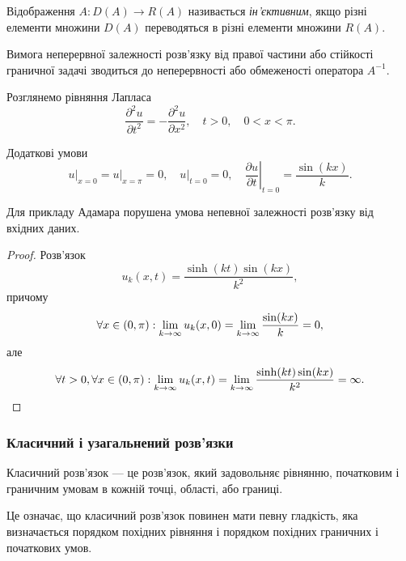 \begin{definition}
    Відображення $A: D(A) \to R(A)$ називається \textit{ін'єктивним}, якщо різні елементи множини $D(A)$ переводяться в різні елементи множини $R(A)$.    
\end{definition}

Вимога неперервної залежності розв'язку від правої частини або стійкості граничної задачі зводиться до неперервності або обмеженості оператора $A^{-1}$.


\begin{example}
    Розглянемо рівняння Лапласа
    \begin{equation}
        \frac{\partial^2 u}{\partial t^2} = - \frac{\partial^2 u}{\partial x^2}, \quad t > 0, \quad 0 < x < \pi.
    \end{equation}

    Додаткові умови
    \begin{equation}
        \left. u \right|_{x = 0} = \left. u \right|_{x = \pi} = 0, \quad \left. u \right|_{t = 0} = 0, \quad \left. \frac{\partial u}{\partial t} \right|_{t = 0} = \frac{\sin (k x)}{k}.
    \end{equation}
\end{example}

\begin{proposition}
    Для прикладу Адамара порушена умова непевної залежності розв'язку від вхідних даних.
\end{proposition}

\begin{proof}
    Розв'язок
    \begin{equation}
        u_k(x, t) = \frac{\sinh(k t) \sin (k x)}{k^2},
    \end{equation}
    причому
    \begin{equation}
        \forall x \in (0, \pi): \displaystyle\lim\limits_{k \to \infty} u_k(x, 0) =  \displaystyle\lim\limits_{k \to \infty} \frac{\sin (k x)}{k} = 0,
    \end{equation}
    але
    \begin{equation}
        \forall t > 0, \forall x \in (0, \pi): \displaystyle\lim\limits_{k \to \infty} u_k(x, t) =  \displaystyle\lim\limits_{k \to \infty} \frac{\sinh(k t) \sin (k x)}{k^2} = \infty.
    \end{equation}
\end{proof}

\subsubsection{Класичний і узагальнений розв'язки}

\begin{definition}
    Класичний розв'язок --- це розв'язок, який задовольняє рівнянню, початковим і граничним умовам в кожній точці, області, або границі.    
\end{definition}

Це означає, що класичний розв'язок повинен мати певну гладкість, яка визначається порядком похідних рівняння і порядком похідних граничних і початкових умов.

\newpage 


